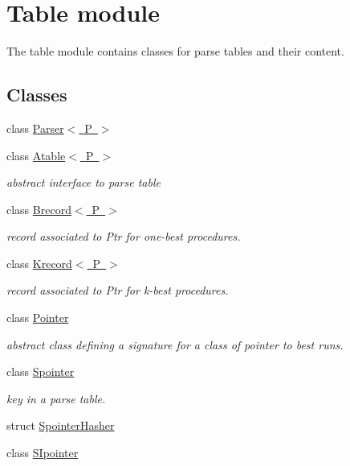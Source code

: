 \hypertarget{group__table}{}\section{Table module}
\label{group__table}


The {\ttfamily table} module contains classes for parse tables and their content.  


\subsection*{Classes}
\begin{DoxyCompactItemize}
\item 
class \mbox{\hyperlink{classParser}{Parser$<$ P $>$}}
\item 
class \mbox{\hyperlink{classAtable}{Atable$<$ P $>$}}
\begin{DoxyCompactList}\small\item\em abstract interface to parse table \end{DoxyCompactList}\item 
class \mbox{\hyperlink{classBrecord}{Brecord$<$ P $>$}}
\begin{DoxyCompactList}\small\item\em record associated to Ptr for one-\/best procedures. \end{DoxyCompactList}\item 
class \mbox{\hyperlink{classKrecord}{Krecord$<$ P $>$}}
\begin{DoxyCompactList}\small\item\em record associated to Ptr for k-\/best procedures. \end{DoxyCompactList}\item 
class \mbox{\hyperlink{classPointer}{Pointer}}
\begin{DoxyCompactList}\small\item\em abstract class defining a signature for a class of pointer to best runs. \end{DoxyCompactList}\item 
class \mbox{\hyperlink{classSpointer}{Spointer}}
\begin{DoxyCompactList}\small\item\em key in a parse table. \end{DoxyCompactList}\item 
struct \mbox{\hyperlink{structSpointerHasher}{Spointer\+Hasher}}
\item 
class \mbox{\hyperlink{classSIpointer}{S\+Ipointer}}

\end{DoxyCompactItemize}
